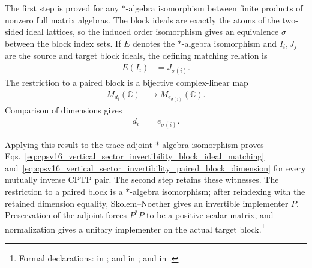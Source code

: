 \documentclass{article}
\begin{document}
The first step is proved for any $*$-algebra isomorphism between finite
products of nonzero full matrix algebras. The block ideals are exactly the
atoms of the two-sided ideal lattices, so the induced order isomorphism gives
an equivalence $\sigma$ between the block index sets. If $E$ denotes the
$*$-algebra isomorphism and $I_i,J_j$ are the source and target block ideals,
the defining matching relation is
\begin{align}
    E(I_i)
        &= J_{\sigma(i)}.
    \label{eq:cpsv16_vertical_sector_invertibility_block_ideal_matching}
\end{align}
The restriction to a paired block is a bijective complex-linear map
\begin{align}
    M_{d_i}(\mathbb C)
        &\longrightarrow M_{e_{\sigma(i)}}(\mathbb C).
    \label{eq:cpsv16_vertical_sector_invertibility_paired_block_map}
\end{align}
Comparison of dimensions gives
\begin{align}
    d_i
        &= e_{\sigma(i)}.
    \label{eq:cpsv16_vertical_sector_invertibility_paired_block_dimension}
\end{align}

Applying this result to the trace-adjoint $*$-algebra isomorphism proves
Eqs.~\ref{eq:cpsv16_vertical_sector_invertibility_block_ideal_matching}
and~\ref{eq:cpsv16_vertical_sector_invertibility_paired_block_dimension} for
every mutually inverse CPTP pair. The second step retains these witnesses. The
restriction to a paired block is a $*$-algebra isomorphism; after reindexing
with the retained dimension equality, Skolem--Noether gives an invertible
implementer $P$. Preservation of the adjoint forces $P^*P$ to be a positive
scalar matrix, and normalization gives a unitary implementer on the actual
target block.\footnote{Formal declarations:
 in
;
 and
 in
;
 and
 in
.}
\end{document}
